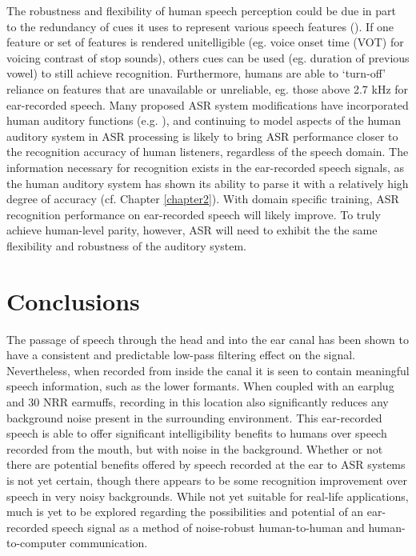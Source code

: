 The robustness and flexibility of human speech perception could be due in part to the redundancy of cues it uses to represent various speech features (\cite{winter:14}).  If one feature or set of features is rendered unitelligible (eg. voice onset time (VOT) for voicing contrast of stop sounds), others cues can be used (eg. duration of previous vowel) to still achieve recognition.  Furthermore, humans are able to `turn-off' reliance on features that are unavailable or unreliable, eg. those above 2.7 kHz for ear-recorded speech.  Many proposed ASR system modifications have incorporated human auditory functions (e.g. \cite{kim:99,fazel:12,moritz:15}), and continuing to model aspects of the human auditory system in ASR processing is likely to bring ASR performance closer to the recognition accuracy of human listeners, regardless of the speech domain.  The information necessary for recognition exists in the ear-recorded speech signals, as the human auditory system has shown its ability to parse it with a relatively high degree of accuracy (cf. Chapter \ref{chapter2}).  With domain specific training, ASR recognition performance on ear-recorded speech will likely improve.
To truly achieve human-level parity, however, ASR will need to exhibit the the same flexibility and robustness of the auditory system.


\section{Conclusions}\label{chap5:conclusions}

The passage of speech through the head and into the ear canal has been shown to have a consistent and predictable low-pass filtering effect on the signal.  Nevertheless, when recorded from inside the canal it is seen to contain meaningful speech information, such as the lower formants.  When coupled with an earplug and 30 NRR earmuffs, recording in this location also significantly reduces any background noise present in the surrounding environment.  This ear-recorded speech is able to offer significant intelligibility benefits to humans over speech recorded from the mouth, but with noise in the background.  Whether or not there are potential benefits offered by speech recorded at the ear to ASR systems is not yet certain, though there appears to be some recognition improvement over speech in very noisy backgrounds. While not yet suitable for real-life applications, much is yet to be explored regarding the possibilities and potential of an ear-recorded speech signal as a method of noise-robust human-to-human and human-to-computer communication.





